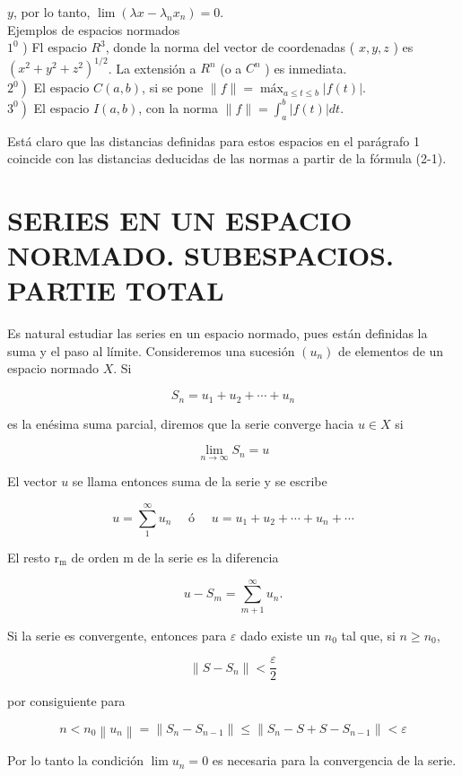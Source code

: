 \documentclass[10pt]{article}
\theoremstyle{plain}
\theoremstyle{definition}
\theoremstyle{remark}
\begin{document}
$y$, por lo tanto, $\lim \left(\lambda x-\lambda_{n} x_{n}\right)=0$.\\
Ejemplos de espacios normados\\
$1^{0}$ ) Fl espacio $R^{3}$, donde la norma del vector de coordenadas ( $x, y, z$ ) es $\left(x^{2}+y^{2}+z^{2}\right)^{1 / 2}$. La extensión a $R^{n}$ (o a $C^{n}$ ) es inmediata.\\
$\left.2^{0}\right)$ El espacio $C(a, b)$, si se pone $\|f\|=\operatorname{máx}_{a \leqslant t \leqslant b}|f(t)|$.\\
$\left.3^{0}\right)$ El espacio $I(a, b)$, con la norma $\|f\|=\int_{a}^{b}|f(t)| d t$.

Está claro que las distancias definidas para estos espacios en el parágrafo 1 coincide con las distancias deducidas de las normas a partir de la fórmula (2-1).

\section*{SERIES EN UN ESPACIO NORMADO. SUBESPACIOS. PARTIE TOTAL}
Es natural estudiar las series en un espacio normado, pues están definidas la suma y el paso al límite. Consideremos una sucesión $\left(u_{n}\right)$ de elementos de un espacio normado $X$. Si

$$
S_{n}=u_{1}+u_{2}+\cdots+u_{n}
$$

es la enésima suma parcial, diremos que la serie converge hacia $u \in X$ si

$$
\lim _{n \rightarrow \infty} S_{n}=u
$$

El vector $u$ se llama entonces suma de la serie y se escribe

$$
u=\sum_{1}^{\infty} u_{n} \quad \text { ó } \quad u=u_{1}+u_{2}+\cdots+u_{n}+\cdots
$$

El resto $\mathrm{r}_{\mathrm{m}}$ de orden m de la serie es la diferencia

$$
u-S_{m}=\sum_{m+1}^{\infty} u_{n} .
$$

Si la serie es convergente, entonces para $\varepsilon$ dado existe un $n_{0}$ tal que, si $n \geqslant n_{0}$,

$$
\left\|S-S_{n}\right\|<\frac{\varepsilon}{2}
$$

por consiguiente para

$$
n<n_{0}\left\|u_{n}\right\|=\left\|S_{n}-S_{n-1}\right\| \leqslant\left\|S_{n}-S+S-S_{n-1}\right\|<\varepsilon
$$

Por lo tanto la condición $\lim u_{n}=0$ es necesaria para la convergencia de la serie.
\end{document}
